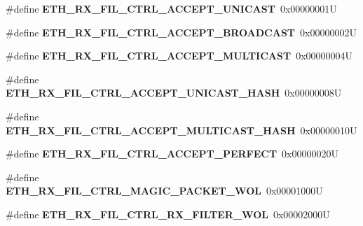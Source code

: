 \begin{DoxyCompactItemize}
\item 
\mbox{\label{lpc-ethernet_8c_a5b1b802439786df40639f9763b4f1891}} 
\#define {\bfseries E\+T\+H\+\_\+\+R\+X\+\_\+\+F\+I\+L\+\_\+\+C\+T\+R\+L\+\_\+\+A\+C\+C\+E\+P\+T\+\_\+\+U\+N\+I\+C\+A\+ST}~0x00000001U
\item 
\mbox{\label{lpc-ethernet_8c_ae88f8606770fd22c47dce43c1e0bbcec}} 
\#define {\bfseries E\+T\+H\+\_\+\+R\+X\+\_\+\+F\+I\+L\+\_\+\+C\+T\+R\+L\+\_\+\+A\+C\+C\+E\+P\+T\+\_\+\+B\+R\+O\+A\+D\+C\+A\+ST}~0x00000002U
\item 
\mbox{\label{lpc-ethernet_8c_acb5cd59c24803952e4df95ae7b227937}} 
\#define {\bfseries E\+T\+H\+\_\+\+R\+X\+\_\+\+F\+I\+L\+\_\+\+C\+T\+R\+L\+\_\+\+A\+C\+C\+E\+P\+T\+\_\+\+M\+U\+L\+T\+I\+C\+A\+ST}~0x00000004U
\item 
\mbox{\label{lpc-ethernet_8c_a08676bfb73beefea28d37f99ee4e5892}} 
\#define {\bfseries E\+T\+H\+\_\+\+R\+X\+\_\+\+F\+I\+L\+\_\+\+C\+T\+R\+L\+\_\+\+A\+C\+C\+E\+P\+T\+\_\+\+U\+N\+I\+C\+A\+S\+T\+\_\+\+H\+A\+SH}~0x00000008U
\item 
\mbox{\label{lpc-ethernet_8c_a8f4408f8812b1017c14b50ad2e89be35}} 
\#define {\bfseries E\+T\+H\+\_\+\+R\+X\+\_\+\+F\+I\+L\+\_\+\+C\+T\+R\+L\+\_\+\+A\+C\+C\+E\+P\+T\+\_\+\+M\+U\+L\+T\+I\+C\+A\+S\+T\+\_\+\+H\+A\+SH}~0x00000010U
\item 
\mbox{\label{lpc-ethernet_8c_ae6399dfa7ee155cae05e2387021e30fa}} 
\#define {\bfseries E\+T\+H\+\_\+\+R\+X\+\_\+\+F\+I\+L\+\_\+\+C\+T\+R\+L\+\_\+\+A\+C\+C\+E\+P\+T\+\_\+\+P\+E\+R\+F\+E\+CT}~0x00000020U
\item 
\mbox{\label{lpc-ethernet_8c_af95b3aa8f110171bcdc593f359c1d905}} 
\#define {\bfseries E\+T\+H\+\_\+\+R\+X\+\_\+\+F\+I\+L\+\_\+\+C\+T\+R\+L\+\_\+\+M\+A\+G\+I\+C\+\_\+\+P\+A\+C\+K\+E\+T\+\_\+\+W\+OL}~0x00001000U
\item 
\mbox{\label{lpc-ethernet_8c_a980d417cbda2311d31b1aa53dc120cb3}} 
\#define {\bfseries E\+T\+H\+\_\+\+R\+X\+\_\+\+F\+I\+L\+\_\+\+C\+T\+R\+L\+\_\+\+R\+X\+\_\+\+F\+I\+L\+T\+E\+R\+\_\+\+W\+OL}~0x00002000U
\item 
\mbox{\label{lpc-ethernet_8c_a3f397a4d855809f92aa5649ccee8a0ec}} 

\end{DoxyCompactItemize}
